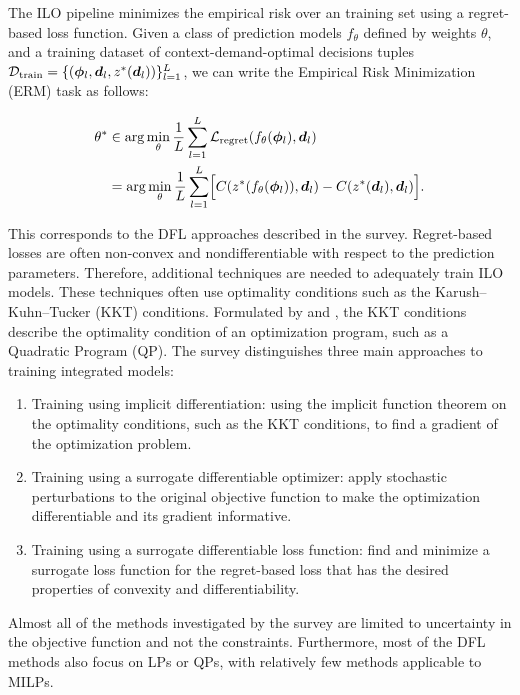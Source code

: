 The ILO pipeline minimizes the empirical risk over an training set using a regret-based loss function. Given a class of prediction models $f_\theta$ defined by weights $\theta$, and a training dataset of context-demand-optimal decisions tuples $\mathcal{D}_\text{train} = \{({\bm{\phi}}_l, {\bm{d}}_l, z^*({\bm{d}}_l))\}_{l=1}^L$, we can write the Empirical Risk Minimization (ERM) task as follows:

\begin{defin}
\begin{align*}
    \theta^* &\in \arg\min_{\theta} \dfrac{1}{L}\sum_{l=1}^L \mathcal{L}_\text{regret}(f_\theta({\bm{\phi}}_l), {\bm{d}}_l) \\
        &= \arg\min_{\theta} \dfrac{1}{L}\sum_{l=1}^L\Bigl[ C(z^*(f_\theta({\bm{\phi}}_l)), {\bm{d}}_l) - C(z^*({\bm{d}}_l), {\bm{d}}_l) \Bigr].
\end{align*}
\end{defin}

This corresponds to the DFL approaches described in the \cite{kotaryFoldedOptimizationEndtoEnd2023} survey. Regret-based losses are often non-convex and nondifferentiable with respect to the prediction parameters. Therefore, additional techniques are needed to adequately train ILO models. These techniques often use optimality conditions such as the Karush–Kuhn–Tucker (KKT) conditions. Formulated by \cite{karushMinimaFunctionsSeveral1939} and \cite{kuhnNonlinearProgramming1951}, the KKT conditions describe the optimality condition of an optimization program, such as a Quadratic Program (QP). The survey distinguishes three main approaches to training integrated models: 
\begin{enumerate}
    \item Training using implicit differentiation: using the implicit function theorem on the optimality conditions, such as the KKT conditions, to find a gradient of the optimization problem.
    \item Training using a surrogate differentiable optimizer: apply stochastic perturbations to the original objective function to make the optimization differentiable and its gradient informative.
    \item Training using a surrogate differentiable loss function: find and minimize a surrogate loss function for the regret-based loss that has the desired properties of convexity and differentiability.
\end{enumerate} 
Almost all of the methods investigated by the survey are limited to uncertainty in the objective function and not the constraints. Furthermore, most of the DFL methods also focus on LPs or QPs, with relatively few methods applicable to MILPs.

